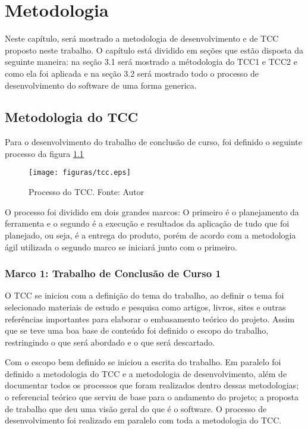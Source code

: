 \chapter{Metodologia}

Neste capítulo, será mostrado a metodologia de desenvolvimento e de TCC proposto neste trabalho. O capítulo está dividido
em seções que estão disposta da seguinte maneira: na seção 3.1 será mostrado a métodologia do TCC1 e TCC2 e como ela foi
aplicada e na seção 3.2 será mostrado todo o processo de desenvolvimento do software de uma forma generica.

\section{Metodologia do TCC}

Para o desenvolvimento do trabalho de conclusão de curso, foi definido o seguinte processo da figura \ref{fig:tcc}

\begin{figure}[h!]
  \centering
  \texttt{[image: figuras/tcc.eps]}
  \caption[Processo do TCC.]{Processo do TCC. Fonte: Autor}
  \label{fig:tcc}
\end{figure}


O processo foi dividido em dois grandes marcos: O primeiro é o planejamento da ferramenta e o segundo é a execução e
resultados da aplicação de tudo que foi planejado, ou seja, é a entrega do produto, porém de acordo com a metodologia
ágil utilizada o segundo marco se iniciará junto com o primeiro.

\subsection{Marco 1: Trabalho de Conclusão de Curso 1}

O TCC se iniciou com a definição do tema do trabalho, ao definir o tema foi selecionado materiais de estudo e pesquisa
como artigos, livros, sites e outras referências importantes para elaborar o embasamento teórico do projeto. Assim que
se teve uma boa base de conteúdo foi definido o escopo do trabalho, restringindo o que será abordado e o que será
descartado.

Com o escopo bem definido se iniciou a escrita do trabalho. Em paralelo foi definido a metodologia do TCC e a
metodologia de desenvolvimento, além de documentar todos os processos que foram realizados dentro dessas metodologias; o
referencial teórico que serviu de base para o andamento do projeto; a proposta de trabalho que deu uma visão geral do
que é o software. O processo de desenvolvimento foi realizado em paralelo com toda a metodologia do TCC.

